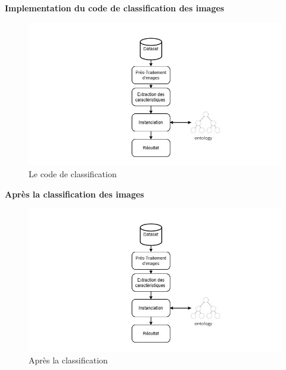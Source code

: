 \documentclass{article}
\begin{document}
		\textbf{ Implementation du code de classification des images}
		\begin{figure}[htbp]
			\begin{center}
				\begin{minipage}[b]{0.7\textwidth}
					\centering
					\includegraphics[width=\textwidth]{img/14.png}
					\caption{Le code de classification}
				\end{minipage}
			\end{center}
		\end{figure}
		
		\textbf{ Après la classification des images }
		\begin{figure}[htbp]
			\begin{center}
				\begin{minipage}[b]{0.7\textwidth}
					\centering
					\includegraphics[width=\textwidth]{img/14.png}
					\caption{Après la classification}
				\end{minipage}
			\end{center}
		\end{figure}
		
\end{document}

